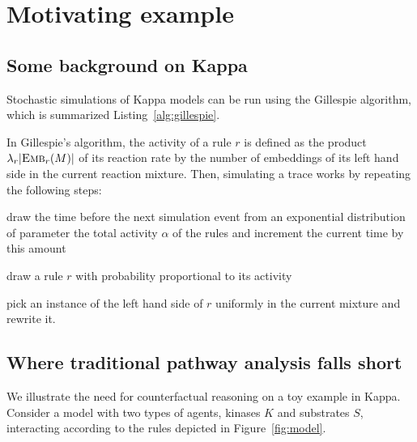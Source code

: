 \section{Motivating example}\label{sec:example}


\subsection{Some background on Kappa}

Stochastic simulations of Kappa models can be run using the Gillespie
algorithm, which is summarized Listing~\ref{alg:gillespie}.



In Gillespie's algorithm, the activity of a rule $r$ is defined as the
product $\lambda_r|{\textsc{Emb}}_{r}(M)|$ of its reaction rate by the number of
embeddings of its left hand side in the current reaction mixture.
Then, simulating a trace works by repeating the following steps:
\begin{inparaenum}[1)]
\item draw the time before the next simulation event from an
  exponential distribution of parameter the total activity $\alpha$ of
  the rules and increment the current time by this amount
\item draw a rule $r$ with probability proportional to its activity
\item pick an instance of the left hand side of $r$ uniformly in the
  current mixture and rewrite it.
\end{inparaenum}



\subsection{Where traditional pathway analysis falls short}


We illustrate the need for counterfactual reasoning on a toy example
in Kappa. Consider a model with two types of agents, kinases $K$ and
substrates $S$, interacting according to the rules depicted in
Figure~\ref{fig:model}.

